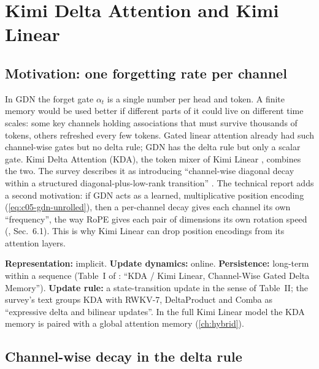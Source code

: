 \section{Kimi Delta Attention and Kimi Linear}\label{sec:c05-kda}

\subsection{Motivation: one forgetting rate per channel}

In GDN the forget gate $\alpha_t$ is a single number per head and token. A finite memory would be
used better if different parts of it could live on different time scales: some key channels
holding associations that must survive thousands of tokens, others refreshed every few tokens.
Gated linear attention \citep{yang2024gla} already had such channel-wise gates but no delta rule;
GDN has the delta rule but only a scalar gate. Kimi Delta Attention (KDA), the token mixer of Kimi
Linear \citep{kimi2025linear}, combines the two. The survey describes it as introducing
``channel-wise diagonal decay within a structured diagonal-plus-low-rank transition''
\citep{zhoubian2026memory}. The technical report adds a second motivation: if GDN acts as a
learned, multiplicative position encoding (\cref{eq:c05-gdn-unrolled}), then a per-channel decay
gives each channel its own ``frequency'', the way RoPE gives each pair of dimensions its own
rotation speed (, Sec.~6.1). This is why
Kimi Linear can drop position encodings from its attention layers.

\begin{taxonomy}
\textbf{Representation:} implicit. \textbf{Update dynamics:} online. \textbf{Persistence:}
long-term within a sequence (Table~I of \citet{zhoubian2026memory}: ``KDA / Kimi Linear,
Channel-Wise Gated Delta Memory''). \textbf{Update rule:} a state-transition update in the sense of
Table~II; the survey's text groups KDA with RWKV-7, DeltaProduct and Comba as ``expressive delta
and bilinear updates''. In the full Kimi Linear model the KDA memory is paired with a global
attention memory (\cref{ch:hybrid}).
\end{taxonomy}

\subsection{Channel-wise decay in the delta rule}\label{sec:c05-kda-rule}

